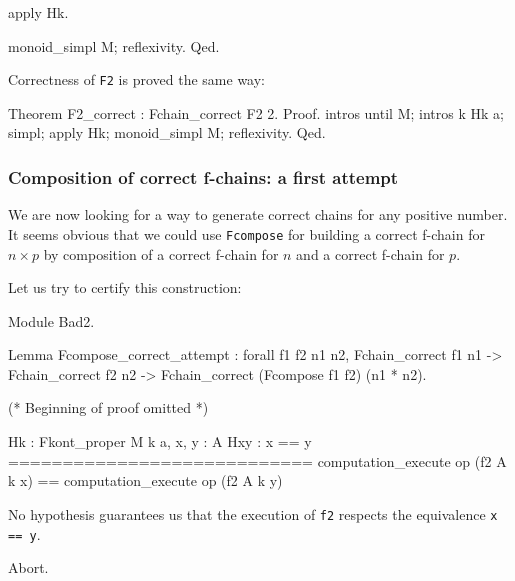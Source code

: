 \begin{Coqsrc}
apply Hk. 
\end{Coqsrc}
  

\begin{Coqanswer}
...
============================
   a * a * a == a * (a * (a * E_one))}
\end{Coqanswer}

\begin{Coqsrc}
  monoid_simpl M; reflexivity.
Qed.
\end{Coqsrc}


Correctness of \texttt{F2} is proved the same way:

\begin{Coqsrc}
Theorem F2_correct : Fchain_correct F2 2.
Proof. 
  intros until M; intros k Hk a; simpl;
  apply Hk;  monoid_simpl M;  reflexivity.
Qed.
\end{Coqsrc}

\subsubsection{Composition of correct f-chains: a first attempt}

We are now looking for a way to generate correct chains for any positive 
number. It seems obvious that we could use \texttt{Fcompose} for building 
a correct f-chain for $n\times p$ by composition of a correct f-chain for 
$n$ and a correct f-chain for $p$.

Let us try to certify this construction:

\begin{Coqbad}
Module Bad2.

Lemma Fcompose_correct_attempt :
  forall f1 f2 n1 n2, Fchain_correct f1 n1 ->
                      Fchain_correct f2 n2 ->
                      Fchain_correct (Fcompose f1 f2)
                                       (n1 * n2).

(* Beginning of proof omitted *)
\end{Coqbad}

\begin{Coqanswer}
  Hk : Fkont_proper M k
  a, x, y : A
  Hxy : x == y
  ============================
   computation_execute op (f2 A k x) == 
   computation_execute op (f2 A k y) 
\end{Coqanswer}

No hypothesis guarantees us that the execution of \texttt{f2} respects the equivalence
\texttt{x == y}.

\begin{Coqbad}
Abort.
\end{Coqbad}

